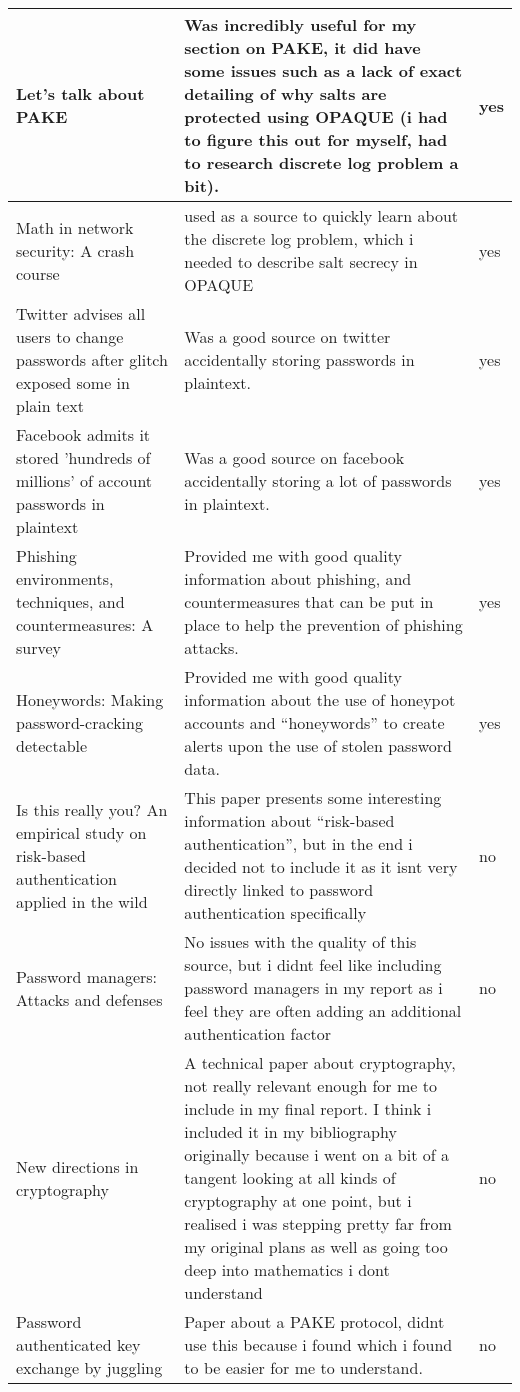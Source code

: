 \documentclass[11pt]{article}
\begin{document}
\begin{center}
{\begin{tabular}{|p{6cm}|p{12cm}|p{1cm}|}
 Let’s talk about PAKE \cite{green2018pake} & Was incredibly useful for my section on PAKE, it did have some issues such as a lack of exact detailing of why salts are protected using OPAQUE (i had to figure this out for myself, had to research discrete log problem a bit). & yes\\
 \hline
 Math in network security: A crash course \cite{dong2016math} & used as a source to quickly learn about the discrete log problem, which i needed to describe salt secrecy in OPAQUE & yes\\
 \hline
 Twitter advises all users to change passwords after glitch exposed some in plain text \cite{heeti2018twitter} & Was a good source on twitter accidentally storing passwords in plaintext. & yes\\
 \hline
 Facebook admits it stored 'hundreds of millions' of account passwords in plaintext \cite{whittaker2019facebook} & Was a good source on facebook accidentally storing a lot of passwords in plaintext. & yes\\ 
 \hline
 Phishing environments, techniques, and countermeasures: A survey \cite{aleroud2017phishing} & Provided me with good quality information about phishing, and countermeasures that can be put in place to help the prevention of phishing attacks. & yes\\
 \hline
 Honeywords: Making password-cracking detectable \cite{juels2013honeywords} & Provided me with good quality information about the use of honeypot accounts and ``honeywords'' to create alerts upon the use of stolen password data. & yes\\
 \hline
 Is this really you? An empirical study on risk-based authentication applied in the wild \cite{wiefling2019really} & This paper presents some interesting information about ``risk-based authentication'', but in the end i decided not to include it as it isnt very directly linked to password authentication specifically & no\\
 \hline
 Password managers: Attacks and defenses \cite{silver2014password} & No issues with the quality of this source, but i didnt feel like including password managers in my report as i feel they are often adding an additional authentication factor & no\\
 \hline
 New directions in cryptography \cite{diffie1976new} & A technical paper about cryptography, not really relevant enough for me to include in my final report. I think i included it in my bibliography originally because i went on a bit of a tangent looking at all kinds of cryptography at one point, but i realised i was stepping pretty far from my original plans as well as going too deep into mathematics i dont understand & no\\
 \hline
 Password authenticated key exchange by juggling \cite{hao2008password} & Paper about a PAKE protocol, didnt use this because i found \cite{green2018pake} which i found to be easier for me to understand. & no\\
 \hline
\end{tabular}
}
\end{center}
\newpage


\end{document}
